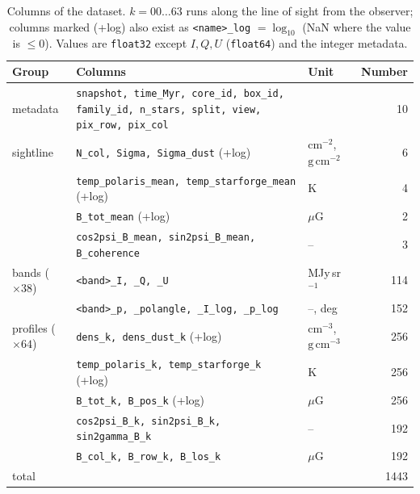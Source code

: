 \begin{table}[ht]
  \centering
  \caption{Columns of the dataset. $k=00\ldots63$ runs along the line of sight from the observer; columns
  marked (+log) also exist as \texttt{<name>\_log} $=\log_{10}$ (NaN where the value is $\le0$). Values are
  \texttt{float32} except $I,Q,U$ (\texttt{float64}) and the integer metadata.}
  \label{tab:columns}
  \small
  \begin{tabular}{@{}p{}p{}p{}r@{}}
    \toprule
    Group & Columns & Unit & Number \\
    \midrule
    metadata & \texttt{snapshot, time\_Myr, core\_id, box\_id, family\_id, n\_stars, split, view, pix\_row, pix\_col} & & 10 \\
    sightline & \texttt{N\_col, Sigma, Sigma\_dust} (+log) & $\mathrm{cm^{-2}}$, $\mathrm{g\,cm^{-2}}$ & 6 \\
              & \texttt{temp\_polaris\_mean, temp\_starforge\_mean} (+log) & K & 4 \\
              & \texttt{B\_tot\_mean} (+log) & $\mu$G & 2 \\
              & \texttt{cos2psi\_B\_mean, sin2psi\_B\_mean, B\_coherence} & -- & 3 \\
    bands ($\times38$) & \texttt{<band>\_I, \_Q, \_U} & MJy\,sr$^{-1}$ & 114 \\
              & \texttt{<band>\_p, \_polangle, \_I\_log, \_p\_log} & --, deg & 152 \\
    profiles ($\times64$) & \texttt{dens\_k, dens\_dust\_k} (+log) & $\mathrm{cm^{-3}}$, $\mathrm{g\,cm^{-3}}$ & 256 \\
              & \texttt{temp\_polaris\_k, temp\_starforge\_k} (+log) & K & 256 \\
              & \texttt{B\_tot\_k, B\_pos\_k} (+log) & $\mu$G & 256 \\
              & \texttt{cos2psi\_B\_k, sin2psi\_B\_k, sin2gamma\_B\_k} & -- & 192 \\
              & \texttt{B\_col\_k, B\_row\_k, B\_los\_k} & $\mu$G & 192 \\
    \midrule
    total & & & 1443 \\
    \bottomrule
  \end{tabular}
\end{table}

